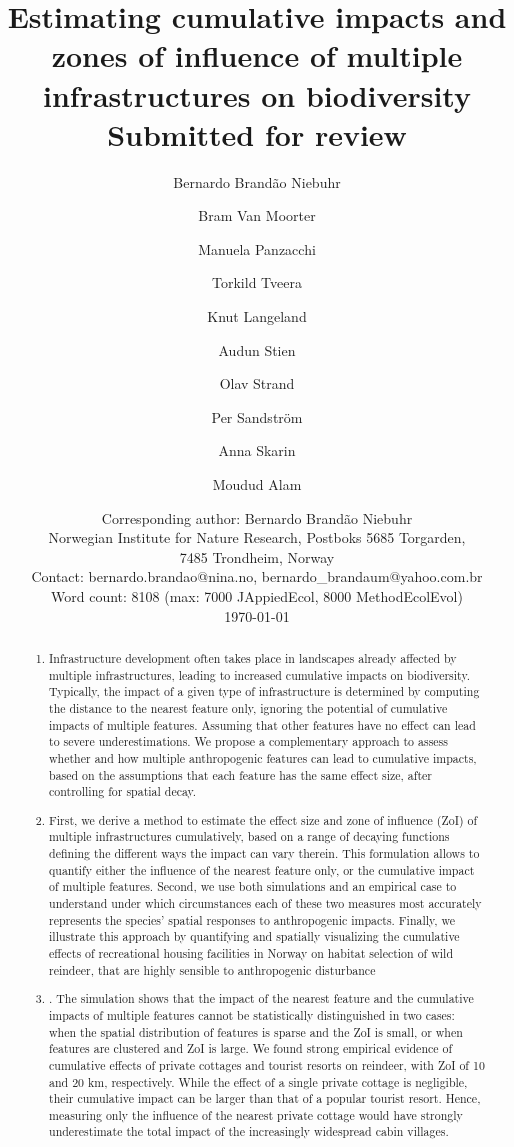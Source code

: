 \documentclass[titlepage]{article}
\title{
Estimating cumulative impacts and zones of influence of multiple infrastructures on biodiversity  \\
{\normalsize Submitted for review}
}
\author[1,2,*]{Bernardo Brandão Niebuhr}
\author[1,*]{Bram Van Moorter}
\author[1]{Manuela Panzacchi}
\author[3]{Torkild Tveera}
\author[3]{Knut Langeland}
\author[4]{Audun Stien}
\author[1]{Olav Strand}
\author[5]{Per Sandström}
\author[2]{Anna Skarin}
\author[6]{Moudud Alam}
\affil[1]{Norwegian Institute for Nature Research (NINA), Trondheim, Norway}
\affil[2]{Swedish University of Agricultural Sciences (SLU), Uppsala, Sweden}
\affil[3]{Norwegian Institute for Nature Research (NINA), Tromsø, Norway}
\affil[4]{University of Tromsø, Tromsø, Norway}
\affil[5]{Swedish University of Agricultural Sciences (SLU), Umeå, Sweden}
\affil[6]{Dalarna University, Falun, Sweden}
\affil[*]{Joint first authorship}
\date{Corresponding author: Bernardo Brandão Niebuhr \\Norwegian Institute for Nature Research, Postboks 5685 Torgarden, \\7485 Trondheim, Norway \\Contact: bernardo.brandao@nina.no, bernardo\_brandaum@yahoo.com.br \\ Word count: 8108 (max: 7000 JAppiedEcol, 8000 MethodEcolEvol) \\ \today}
\begin{document}
\maketitle

\begin{abstract}

\begin{enumerate}

    \item Infrastructure development often takes place in landscapes already affected by multiple infrastructures, leading to increased cumulative impacts on biodiversity. Typically, the impact of a given type of infrastructure is determined by computing the distance to the nearest feature only, ignoring the potential of cumulative impacts of multiple features. Assuming that other features have no effect can lead to severe underestimations. We propose a complementary approach to assess whether and how multiple anthropogenic features can lead to cumulative impacts, based on the assumptions that each feature has the same effect size, after controlling for spatial decay.
   
    \item First, we derive a method to estimate the effect size and zone of influence (ZoI) of multiple infrastructures cumulatively, based on a range of decaying functions defining the different ways the impact can vary therein. This formulation allows to quantify either the influence of the nearest feature only, or the cumulative impact of multiple features. Second, we use both simulations and an empirical case to understand under which circumstances each of these two measures most accurately represents the species' spatial responses to anthropogenic impacts. Finally, we illustrate this approach by quantifying and spatially visualizing the cumulative effects of recreational housing facilities in Norway on habitat selection of wild reindeer, that are highly sensible to anthropogenic disturbance
   
    \item . The simulation shows that the impact of the nearest feature and the cumulative impacts of multiple features cannot be statistically distinguished in two cases: when the spatial distribution of features is sparse and the ZoI is small, or when features are clustered and ZoI is large. We found strong empirical evidence of cumulative effects of private cottages and tourist resorts on reindeer, with ZoI of 10 and 20 km, respectively. While the effect of a single private cottage is negligible, their cumulative impact can be larger than that of a popular tourist resort.  Hence, measuring only the influence of the nearest private cottage would have strongly underestimate the total impact of the increasingly widespread cabin villages.
    

\end{enumerate}
\end{abstract}
\end{document}
